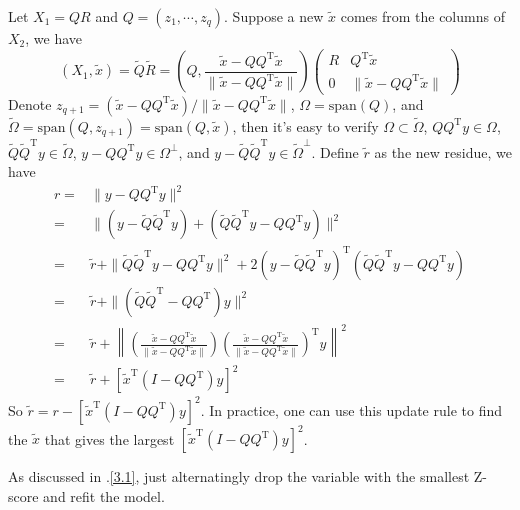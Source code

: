 \begin{sol}
Let $X_1=QR$ and $Q=(z_1,\cdots,z_q)$. Suppose a new $\tilde{x}$ comes from the columns of $X_2$, we have
\[
(X_1, \tilde{x})=\tilde{Q}\tilde{R}=\left(Q,\frac{\tilde{x}-QQ^\mathrm{T}\tilde{x}}{\|\tilde{x}-QQ^\mathrm{T}\tilde{x}\|}\right)
\begin{pmatrix}
R & Q^\mathrm{T}\tilde{x}\\
0 & \|\tilde{x}-QQ^\mathrm{T}\tilde{x}\|
\end{pmatrix}
\]
Denote $z_{q+1}=(\tilde{x}-QQ^\mathrm{T}\tilde{x})/\|\tilde{x}-QQ^\mathrm{T}\tilde{x}\|$, $\Omega=\mathrm{span}(Q)$, and $\tilde{\Omega}=\mathrm{span}(Q,z_{q+1})=\mathrm{span}(Q,\tilde{x})$, then it's easy to verify
$\Omega\subset\tilde{\Omega}$, $QQ^\mathrm{T}y\in \Omega$, $\tilde{Q}\tilde{Q}^\mathrm{T}y\in \tilde{\Omega}$, $y-QQ^\mathrm{T}y\in \Omega^\perp$, and $y-\tilde{Q}\tilde{Q}^\mathrm{T}y\in \tilde{\Omega}^\perp$. Define $\tilde{r}$ as the new residue, we have
\begin{align*}
r =& \|y-QQ^\mathrm{T}y\|^2\\
=& \|(y-\tilde{Q}\tilde{Q}^\mathrm{T}y)+(\tilde{Q}\tilde{Q}^\mathrm{T}y-QQ^\mathrm{T}y)\|^2\\
=& \tilde{r} + \|\tilde{Q}\tilde{Q}^\mathrm{T}y-QQ^\mathrm{T}y\|^2 + 2(y-\tilde{Q}\tilde{Q}^\mathrm{T}y)^\mathrm{T}(\tilde{Q}\tilde{Q}^\mathrm{T}y-QQ^\mathrm{T}y)\\
=& \tilde{r} + \|(\tilde{Q}\tilde{Q}^\mathrm{T}-QQ^\mathrm{T})y\|^2\\
=& \tilde{r} + \left\|\left(\frac{\tilde{x}-QQ^\mathrm{T}\tilde{x}}{\|\tilde{x}-QQ^\mathrm{T}\tilde{x}\|}\right)\left(\frac{\tilde{x}-QQ^\mathrm{T}\tilde{x}}{\|\tilde{x}-QQ^\mathrm{T}\tilde{x}\|}\right)^\mathrm{T}y\right\|^2\\
=& \tilde{r} + \left[\tilde{x}^\mathrm{T}(I-QQ^\mathrm{T})y\right]^2
\end{align*}
So $\tilde{r}=r-[\tilde{x}^\mathrm{T}(I-QQ^\mathrm{T})y]^2$. In practice, one can use this update rule to find the $\tilde{x}$ that gives the largest $\left[\tilde{x}^\mathrm{T}(I-QQ^\mathrm{T})y\right]^2$.
\end{sol}

\begin{sol}
As discussed in \thesection.\ref{3.1}, just alternatingly drop the variable with the smallest Z-score and refit the model.
\end{sol}